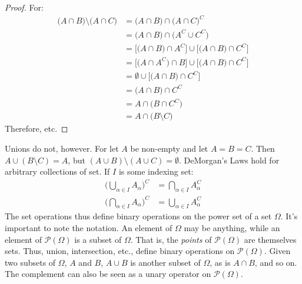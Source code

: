             \begin{proof}
                For:
                \begin{subequations}
                    \begin{align}
                        \big(A\cap{B}\big)\setminus
                            \big(A\cap{C}\big)
                        &=\big(A\cap{B}\big)
                            \cap\big(A\cap{C}\big)^{C}\\
                        &=\big(A\cap{B}\big)
                            \cap\big(A^{C}\cup{C}^{C}\big)\\
                        &=\big[\big(A\cap{B}\big)\cap{A}^{C}\big]
                            \cup\big[\big({A}\cap{B}\big)
                            \cap{C}^{C}\big]\\
                        &=\big[\big(A\cap{A}^{C}\big)\cap{B}\big]
                            \cup\big[\big(A\cap{B}\big)
                            \cap{C}^{C}\big]\\
                        &=\emptyset\cup\big[\big(A\cap{B}\big)
                            \cap{C}^{C}\big]\\
                        &=\big(A\cap{B}\big)\cap{C}^{C}\\
                        &=A\cap\big(B\cap{C}^{C}\big)\\
                        &=A\cap\big(B\setminus{C}\big)
                    \end{align}
                \end{subequations}
                Therefore, etc.
            \end{proof}
            Unions do not, however. For let $A$ be non-empty
            and let $A=B=C$. Then $A\cup(B\setminus{C})=A$, but
            $(A\cup{B})\setminus(A\cup{C})=\emptyset$.
            DeMorgan's Laws hold for arbitrary collections
            of set. If $I$ is some indexing set:
            \begin{align}
                \Big(\bigcup_{\alpha\in{I}}A_{\alpha}\Big)^{C}
                &=\bigcap_{\alpha\in{I}}A_{\alpha}^{C}\\
                \Big(\bigcap_{\alpha\in{I}}A_{\alpha}\Big)^{C}
                &=\bigcup_{\alpha\in{I}}A_{\alpha}^{C}
            \end{align}
            The set operations thus define binary operations
            on the power set of a set $\Omega$. It's important
            to note the notation. An element of $\Omega$ may
            be anything, while an element of
            $\mathcal{P}(\Omega)$ is a subset of $\Omega$.
            That is, the \textit{points} of $\mathcal{P}(\Omega)$
            are themselves sets. Thus, union, intersection,
            etc., define binary operations on
            $\mathcal{P}(\Omega)$. Given two subsets of
            $\Omega$, $A$ and $B$, $A\cup{B}$ is another
            subset of $\Omega$, as is $A\cap{B}$, and so on.
            The complement can also be seen as a unary operator
            on $\mathcal{P}(\Omega)$.
